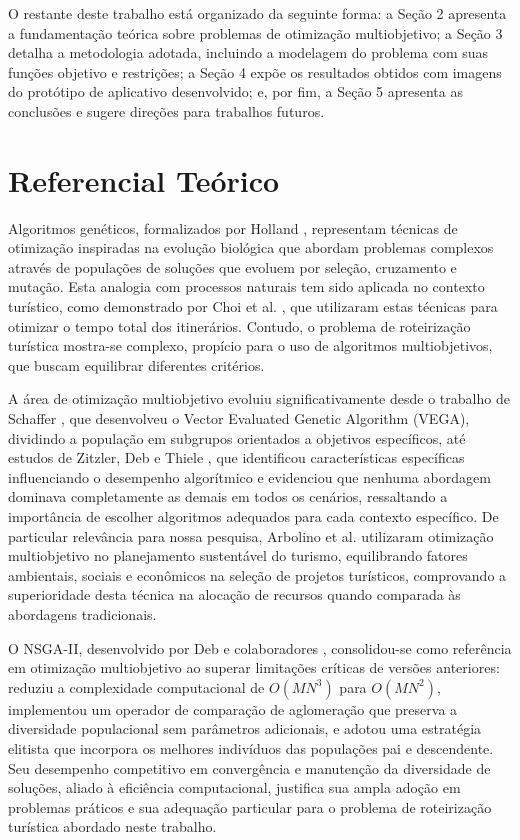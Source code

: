 \documentclass{pssbmac}
\begin{document}
O restante deste trabalho está organizado da seguinte forma: a Seção 2 apresenta a fundamentação teórica sobre problemas de otimização multiobjetivo; a Seção 3 detalha a metodologia adotada, incluindo a modelagem do problema com suas funções objetivo e restrições; a Seção 4 expõe os resultados obtidos com imagens do protótipo de aplicativo desenvolvido; e, por fim, a Seção 5 apresenta as conclusões e sugere direções para trabalhos futuros.


\section{Referencial Teórico}

Algoritmos genéticos, formalizados por Holland \cite{Holland1973}, representam técnicas de otimização inspiradas na evolução biológica que abordam problemas complexos através de populações de soluções que evoluem por seleção, cruzamento e mutação. Esta analogia com processos naturais tem sido aplicada no contexto turístico, como demonstrado por Choi et al. \cite{Choi2022}, que utilizaram estas técnicas para otimizar o tempo total dos itinerários. Contudo, o problema de roteirização turística mostra-se complexo,  propício para o uso de algoritmos multiobjetivos, que buscam equilibrar diferentes critérios.

A área de otimização multiobjetivo evoluiu significativamente desde o trabalho de Schaffer \cite{Schaffer1985}, que desenvolveu o Vector Evaluated Genetic Algorithm (VEGA), dividindo a população em subgrupos orientados a objetivos específicos, até estudos de Zitzler, Deb e Thiele \cite{zitzler2000comparison}, que identificou características específicas influenciando o desempenho algorítmico e evidenciou que nenhuma abordagem dominava completamente as demais em todos os cenários, ressaltando a importância de escolher algoritmos adequados para cada contexto específico. De particular relevância para nossa pesquisa, Arbolino et al. \cite{Arbolino2021} utilizaram otimização multiobjetivo no planejamento sustentável do turismo, equilibrando fatores ambientais, sociais e econômicos na seleção de projetos turísticos, comprovando a superioridade desta técnica na alocação de recursos quando comparada às abordagens tradicionais.

O NSGA-II, desenvolvido por Deb e colaboradores \cite{Deb2002}, consolidou-se como referência em otimização multiobjetivo ao superar limitações críticas de versões anteriores: reduziu a complexidade computacional de $O(MN^3)$ para $O(MN^2)$, implementou um operador de comparação de aglomeração que preserva a diversidade populacional sem parâmetros adicionais, e adotou uma estratégia elitista que incorpora os melhores indivíduos das populações pai e descendente. Seu desempenho competitivo em convergência e manutenção da diversidade de soluções, aliado à eficiência computacional, justifica sua ampla adoção em problemas práticos e sua adequação particular para o problema de roteirização turística abordado neste trabalho.
\end{document}
